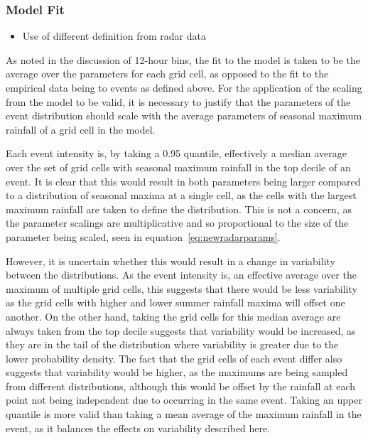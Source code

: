 \subsubsection{Model Fit}
\begin{itemize}\item Use of different definition from radar data\end{itemize}

As noted in the discussion of 12-hour bins,
    the fit to the model is taken to be the average over the parameters for each grid cell,
    as opposed to the fit to the empirical data being to events as defined above.
For the application of the scaling from the model to be valid,
     it is necessary to justify that the parameters of the event distribution should scale with
    the average parameters of seasonal maximum rainfall of a grid cell in the model.

Each event intensity is,
    by taking a 0.95 quantile,
    effectively a median average over the set of grid cells with seasonal maximum rainfall in the top decile of an event.
It is clear that this would result in both parameters being larger compared to a distribution of seasonal maxima at a single cell,
    as the cells with the largest maximum rainfall are taken to define the distribution.
This is not a concern,
    as the parameter scalings are multiplicative and so proportional to the size of the parameter being scaled,
    seen in equation~\ref{eq:newradarparams}.

However,
    it is uncertain whether this would result in a change in variability between the distributions.
As the event intensity is,
    an effective average over the maximum of multiple grid cells,
    this suggests that there would be less variability as the grid cells with higher and lower summer rainfall maxima will offset one another.
On the other hand,
    taking the grid cells for this median average are always taken from the top decile suggests
    that variability would be increased, as they are in the tail of the distribution where variability is greater
    due to the lower probability density.
The fact that the grid cells of each event differ also suggests that variability would be higher,
    as the maximums are being sampled from different distributions,
    although this would be offset by the rainfall at each point not being independent due to occurring in the same event.
Taking an upper quantile is more valid than taking a mean average of the maximum rainfall in the event,
    as it balances the effects on variability described here.

